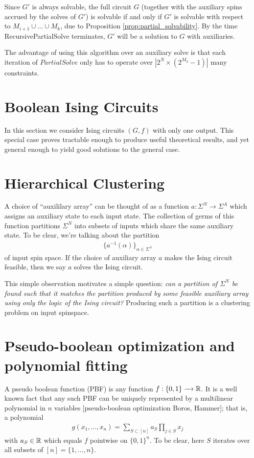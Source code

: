 \documentclass{amsart}
\begin{document}
Since $G'$ is always solvable, the full circuit $G$ (together with the auxiliary spins accrued by the solves of $G'$) is solvable if and only if $G'$ is solvable with respect to $M_{i+1} \cup ... \cup M_k$, due to Proposition \ref{prop:partial_solvability}. By the time RecursivePartialSolve terminates, $G'$ will be a solution to $G$ with auxiliaries.

The advantage of using this algorithm over an auxiliary solve is that each iteration of $PartialSolve$ only has to operate over $|2^N\times (2^{M_2} - 1)|$ many constraints.



\section{Boolean Ising Circuits}
In this section we consider Ising circuits $(G,f)$ with only one output. This special case proves tractable enough to produce useful theoretical results, and yet general enough to yield good solutions to the general case.

\begin{prop}\label{prop:boolean-ising-svm-equiv}
  
\end{prop}
\section{Hierarchical Clustering}

A choice of ``auxililary array'' can be thought of as a function $a:\Sigma^N \to \Sigma^A$ which assigns an auxiliary state to each input state. The collection of germs of this function partitions $\Sigma^N$ into subsets of inputs which share the same auxiliary state. To be clear, we're talking about the partition
\begin{align*}
  \{a^{-1}(\alpha)\}_{\alpha \in \Sigma^A}
\end{align*}
of input spin space. If the choice of auxiliary array $a$ makes the Ising circuit feasible, then we say $a$ solves the Ising circuit.

This simple observation motivates a simple question: \emph{can a partition of $\Sigma^N$ be found such that it matches the partition produced by some feasible auxiliary array using only the logic of the Ising circuit?} Producing such a partition is a clustering problem on input spinspace.

\section{Pseudo-boolean optimization and polynomial fitting}
A pseudo boolean function (PBF) is any function $f:\{0,1\}\to \bR$. It is a well known fact that any such PBF can be uniquely represented by a multilinear polynomial in $n$ variables [pseudo-boolean optimization Boros, Hammer]; that is, a polynomial
\begin{align*}
  g(x_1,...,x_n) = \sum_{S \subset [n]} a_S \prod_{j \in S}x_j
\end{align*}
with $a_S \in \mathbb{R}$ which equals $f$ pointwise on $\{0,1\}^n$. To be clear, here $S$ iterates over all subsets of $[n] = \{1,...,n\}$.
\end{document}
